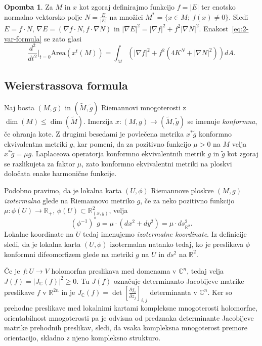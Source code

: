 \documentclass[12pt,a4paper,twoside]{article}
\theoremstyle{definition} %
\newtheorem{opomba}[definicija]{Opomba}
\theoremstyle{plain} %
\numberwithin{equation}{section}  %
\newcommand{\R}{\mathbb R}
\newcommand{\C}{\mathbb C}
\begin{document}
\begin{opomba}
Za $M$ in $x$ kot zgoraj definirajmo funkcijo $f = |E|$ ter enotsko normalno vektorsko polje $N = \frac{E}{|E|}$ na množici $M^{*} = \{ x \in M ; \ f(x) \neq 0 \}$. Sledi $E = f \cdot N$, $\nabla E = (\nabla f \cdot N, f \cdot \nabla N)$ in $|\nabla E|^2 = |\nabla f|^2 + f^2 |\nabla N|^2$.
Enakost~\eqref{eq:2-var-formula} se zato glasi
\begin{equation}
\frac{d^2}{dt^2} \Big|_{t=0} \text{Area} \left(x^{t}(M)\right) = \int_{M} {\left( |\nabla f|^2 + f^2 (4K^{N} + |\nabla N|^2) \right) dA}.
\end{equation}
\end{opomba}

\subsection{Weierstrassova formula}
%
Naj bosta $(M,g)$ in $(\widetilde{M},\tilde{g})$ Riemannovi mnogoterosti z $\dim(M) \leq \dim(\widetilde{M})$.
Imerzija $x \colon (M,g) \to (\widetilde{M}, \tilde{g})$ se imenuje \emph{konformna}, če ohranja kote.
Z drugimi besedami je povlečena metrika $x^{*}\tilde{g}$ konformno ekvivalentna metriki $g$, kar pomeni, da za pozitivno funkcijo $\mu > 0$ na $M$ velja $x^{*}\tilde{g} = \mu g$. \newline
Laplaceova operatorja konformno ekvivalentnih metrik $g$ in $\tilde{g}$ kot zgoraj se razlikujeta za faktor $\mu$, zato konformno ekvivalentni metriki na ploskvi določata enake harmonične funkcije.

Podobno pravimo, da je lokalna karta $(U, \phi)$ Riemannove ploskve $(M,g)$ \emph{izotermalna} glede na Riemannovo metriko $g$, če za neko pozitivno funkcijo $\mu \colon \phi(U) \to \mathbb{R}_{+}$, $\phi(U) \subset \mathbb{R}_{(x,y)}^2$, velja
\begin{equation}
(\phi^{-1})^{*}g = \mu \cdot (dx^2+dy^2) = \mu \cdot ds_{\mathbb{R}^2}^2.
\end{equation} 
Lokalne koordinate na $U$ tedaj imenujemo \emph{izotermalne koordinate}. \newline
Iz definicije sledi, da je lokalna karta $(U, \phi)$ izotermalna natanko tedaj, ko je preslikava $\phi$ konformni difeomorfizem glede na metriki $g$ na $U$ in $ds^2$ na $\R^2$. \newline

Če je $f \colon U \to V$ holomorfna preslikava med domenama v $\C^{n}$, tedaj velja $J(f) = |J_{\C}(f)|^2 \geq 0$. Tu $J(f)$ označuje determinanto Jacobijeve matrike preslikave $f$ v $\R^{2n}$ in je $J_{\C}(f) = \det \left[ \frac{\partial f_{i}}{\partial z_{j}} \right]_{i,j}$ determinanta v $\C^{n}$. Ker so prehodne preslikave med lokalnimi kartami kompleksne mnogoterosti holomorfne, orientabilnost mnogoterosti pa je odvisna od predznaka determinante Jacobijeve matrike prehodnih preslikav, sledi, da vsaka kompleksna mnogoterost premore orientacijo, skladno z njeno kompleksno strukturo.
\end{document}
